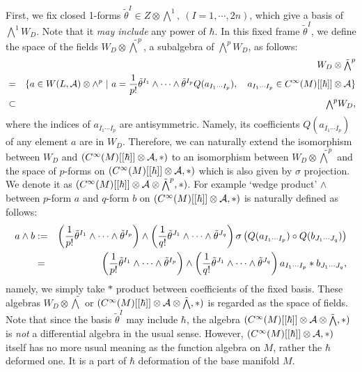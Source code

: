 \documentclass[10pt,a4paper]{article}
\def\h{\hbar}
\begin{document}
First, we fix closed 1-forms ${\tilde \theta}^I\in Z\otimes {\scriptstyle \bigwedge}^1,\ (I=1,\cdots,2n)$, which give a basis of ${\scriptstyle \bigwedge}^1W_D$. Note that it {\it may include} any power of $\h$.
In this fixed frame ${\tilde \theta}^I$, we define the space of the fields $W_D\otimes {\tilde {\scriptstyle \bigwedge}}^p$, a subalgebra of ${\scriptstyle \bigwedge}^pW_D$, as follows:
\begin{eqnarray}
&&W_D\otimes {\tilde {\scriptstyle \bigwedge}}^p\nonumber\\
&=&\{a\in W(L,{\cal A})\otimes \wedge^p\ |\ a={1\over p!}{\tilde \theta}^{I_1}\wedge\cdots\wedge{\tilde \theta}^{I_p}Q(a_{I_1\cdots I_p}),\quad a_{I_1\cdots I_p}\in C^\infty(M)[[\h]]\otimes {\cal A}\}\nonumber\\
&\subset& {\scriptstyle \bigwedge}^pW_D,
\end{eqnarray}
where the indices of $a_{I_1\cdots I_p}$ are antisymmetric. Namely, its coefficients $Q(a_{I_1\cdots I_p})$ of any element $a$ are in $W_D$.
Therefore, we can naturally extend the isomorphism between $W_D$ and $(C^\infty(M)[[\h]]\otimes {\cal A},*)$ to an isomorphism between $W_D\otimes {\tilde {\scriptstyle \bigwedge}}^p$ and the space of $p$-forms on $(C^\infty(M)[[\h]]\otimes {\cal A},*)$ which is also given by $\sigma$ projection. 
We denote it as $(C^\infty(M)[[\h]]\otimes {\cal A}\otimes {\tilde {\scriptstyle \bigwedge}}^p,*)$.
 For example `wedge product' $\wedge$ between $p$-form $a$ and $q$-form $b$ on $(C^\infty(M)[[\h]]\otimes {\cal A},*)$ is naturally defined as follows:
\begin{eqnarray}
a\wedge b&:=&\left({1\over p!}{\tilde \theta}^{I_1}\wedge\cdots\wedge{\tilde \theta}^{I_p}\right)\wedge\left({1\over q!}{\tilde \theta}^{J_1}\wedge\cdots\wedge{\tilde \theta}^{J_q}\right)\sigma\left(Q(a_{I_1\cdots I_p})\circ Q(b_{J_1\cdots J_q})\right)\nonumber\\
&=&\left({1\over p!}{\tilde \theta}^{I_1}\wedge\cdots\wedge{\tilde \theta}^{I_p}\right)\wedge\left({1\over q!}{\tilde \theta}^{J_1}\wedge\cdots\wedge{\tilde \theta}^{J_q}\right)a_{I_1\cdots I_p}*b_{J_1\cdots J_q},
\end{eqnarray}
namely, we simply take $*$ product between coefficients of the fixed basis. 
These algebras $W_D\otimes {\tilde {\scriptstyle \bigwedge}}$ or $(C^\infty(M)[[\h]]\otimes {\cal A}\otimes {\tilde {\scriptstyle \bigwedge}},*)$ is regarded as the space of fields.
Note that since the basis ${\tilde \theta}^{I}$ may include $\h$, the algebra $(C^\infty(M)[[\h]]\otimes {\cal A}\otimes {\tilde {\scriptstyle \bigwedge}},*)$ is {\it not} a differential algebra in the usual sense. However, $(C^\infty(M)[[\h]]\otimes {\cal A},*)$ itself has no more usual meaning as the function algebra on $M$, rather the $\h$ deformed one. It is a part of $\h$ deformation of the base manifold $M$.\\
\end{document}
